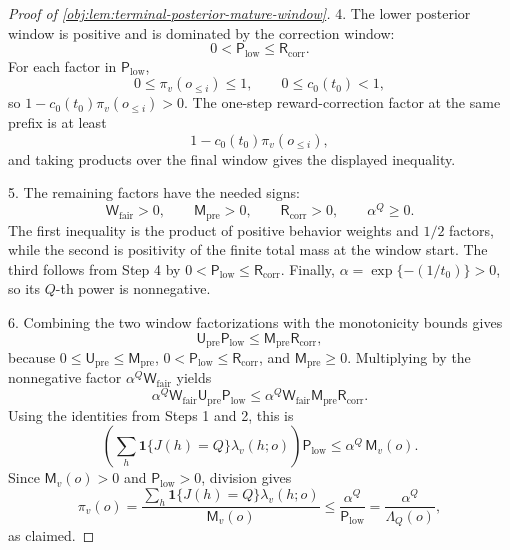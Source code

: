 \documentclass[11pt]{article}
\begin{document}
\begin{proof}[Proof of \cref{obj:lem:terminal-posterior-mature-window}]
4. The lower posterior window is positive and is dominated by the correction window:
\[
0<\mathsf P_{\mathrm{low}}\le \mathsf R_{\mathrm{corr}} .
\]
For each factor in \(\mathsf P_{\mathrm{low}}\),
\[
0\le \pi_v(o_{\le i})\le 1,
\qquad
0\le c_0(t_0)<1,
\]
so \(1-c_0(t_0)\pi_v(o_{\le i})>0\).  The one-step reward-correction factor at the same prefix is at least
\[
1-c_0(t_0)\pi_v(o_{\le i}),
\]
and taking products over the final window gives the displayed inequality. %

5. The remaining factors have the needed signs:
\[
\mathsf W_{\mathrm{fair}}>0,\qquad
\mathsf M_{\mathrm{pre}}>0,\qquad
\mathsf R_{\mathrm{corr}}>0,\qquad
\alpha^Q\ge 0 .
\]
The first inequality is the product of positive behavior weights and \(1/2\) factors, while the second is positivity of the finite total mass at the window start.  The third follows from Step 4 by \(0<\mathsf P_{\mathrm{low}}\le \mathsf R_{\mathrm{corr}}\).  Finally, \(\alpha=\exp\{-(1/t_0)\}>0\), so its \(Q\)-th power is nonnegative. %

6. Combining the two window factorizations with the monotonicity bounds gives
\[
\mathsf U_{\mathrm{pre}}\mathsf P_{\mathrm{low}}
\le
\mathsf M_{\mathrm{pre}}\mathsf R_{\mathrm{corr}},
\]
because \(0\le \mathsf U_{\mathrm{pre}}\le \mathsf M_{\mathrm{pre}}\), \(0<\mathsf P_{\mathrm{low}}\le \mathsf R_{\mathrm{corr}}\), and \(\mathsf M_{\mathrm{pre}}\ge0\).  Multiplying by the nonnegative factor
\(\alpha^Q\mathsf W_{\mathrm{fair}}\) yields
\[
\alpha^Q\mathsf W_{\mathrm{fair}}\mathsf U_{\mathrm{pre}}\mathsf P_{\mathrm{low}}
\le
\alpha^Q\mathsf W_{\mathrm{fair}}\mathsf M_{\mathrm{pre}}\mathsf R_{\mathrm{corr}} .
\]
Using the identities from Steps 1 and 2, this is
\[
\left(
\sum_h \mathbf 1\{J(h)=Q\}\lambda_v(h;o)
\right)\mathsf P_{\mathrm{low}}
\le
\alpha^Q\,\mathsf M_v(o).
\]
Since \(\mathsf M_v(o)>0\) and \(\mathsf P_{\mathrm{low}}>0\), division gives
\[
\pi_v(o)
=
\frac{
\sum_h \mathbf 1\{J(h)=Q\}\lambda_v(h;o)
}{
\mathsf M_v(o)
}
\le
\frac{\alpha^Q}{\mathsf P_{\mathrm{low}}}
=
\frac{\alpha^Q}{\Lambda_Q(o)} ,
\]
as claimed. %
\end{proof}
\end{document}
